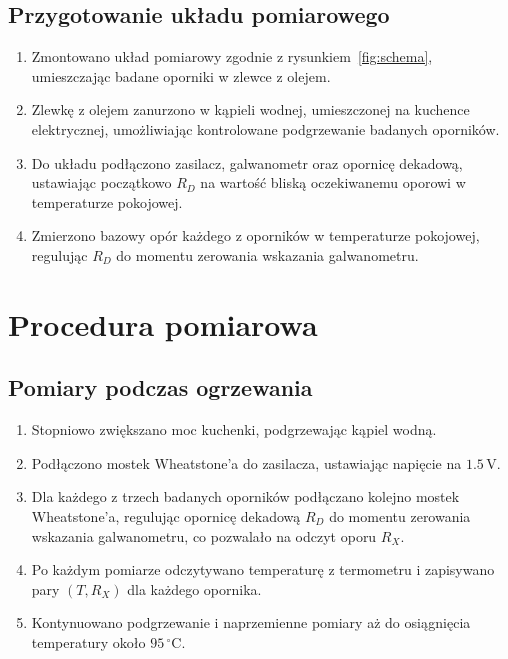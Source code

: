 \documentclass[12pt, a4paper]{article}
\begin{document}
\subsection{Przygotowanie układu pomiarowego}
\begin{enumerate}
    \item Zmontowano układ pomiarowy zgodnie z rysunkiem~\ref{fig:schema}, umieszczając badane oporniki w zlewce z olejem.
    \item Zlewkę z olejem zanurzono w kąpieli wodnej, umieszczonej na kuchence elektrycznej, umożliwiając kontrolowane podgrzewanie badanych oporników.
    \item Do układu podłączono zasilacz, galwanometr oraz opornicę dekadową, ustawiając początkowo $R_D$ na wartość bliską oczekiwanemu oporowi w temperaturze pokojowej.
    \item Zmierzono bazowy opór każdego z oporników w temperaturze pokojowej, regulując $R_D$ do momentu zerowania wskazania galwanometru.
\end{enumerate}
\section{Procedura pomiarowa}
\subsection{Pomiary podczas ogrzewania}
\begin{enumerate}
    \item Stopniowo zwiększano moc kuchenki, podgrzewając kąpiel wodną.
    \item Podłączono mostek Wheatstone'a do zasilacza, ustawiając napięcie na $1.5\,\mathrm{V}$.
    \item Dla każdego z trzech badanych oporników podłączano kolejno mostek Wheatstone'a, regulując opornicę dekadową $R_D$ do momentu zerowania wskazania galwanometru, co pozwalało na odczyt oporu $R_X$.
    \item Po każdym pomiarze odczytywano temperaturę z termometru i zapisywano pary $(T, R_X)$ dla każdego opornika.
    \item Kontynuowano podgrzewanie i naprzemienne pomiary aż do osiągnięcia temperatury około $95\,^\circ\mathrm{C}$.
\end{enumerate}
\end{document}
